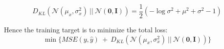 \begin{equation}
	\label{eq:vae_KLD_loss}
	D_{KL}( \mathcal{N}(\mu_{x}, \sigma_{x}^{2}) ~ || ~ \mathcal{N}(\textbf{0}, \textbf{I} ) )  = \dfrac{1}{2} (-\log\sigma^{2} + \mu^{2} + \sigma^{2} - 1)
\end{equation}

Hence the training target is to minimize the total loss:
\begin{equation}
	\label{eq:vae_total_loss}
	\min  \{ \textit{MSE} (y, \hat{y})  ~ + ~  D_{KL}( \mathcal{N}(\mu_{x}, \sigma_{x}^{2}) ~ || ~ \mathcal{N}(\textbf{0}, \textbf{I} ) )  \}
\end{equation}




